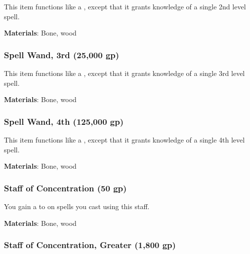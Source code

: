 This item functions like a , except that it grants knowledge of a single 2nd level spell.



\vspace{0.25em}
\textbf{Materials}: Bone, wood


\lowercase{\hypertarget{item:Spell Wand, 3rd}{}}\label{item:Spell Wand, 3rd}
\hypertarget{item:Spell Wand, 3rd}{\subsubsection{Spell Wand, 3rd\hfill{} (25,000 gp)}}

This item functions like a , except that it grants knowledge of a single 3rd level spell.



\vspace{0.25em}
\textbf{Materials}: Bone, wood


\lowercase{\hypertarget{item:Spell Wand, 4th}{}}\label{item:Spell Wand, 4th}
\hypertarget{item:Spell Wand, 4th}{\subsubsection{Spell Wand, 4th\hfill{} (125,000 gp)}}

This item functions like a , except that it grants knowledge of a single 4th level spell.



\vspace{0.25em}
\textbf{Materials}: Bone, wood


\lowercase{\hypertarget{item:Staff of Concentration}{}}\label{item:Staff of Concentration}
\hypertarget{item:Staff of Concentration}{\subsubsection{Staff of Concentration\hfill{} (50 gp)}}

You gain a   to  on spells you cast using this staff.



\vspace{0.25em}
\textbf{Materials}: Bone, wood


\lowercase{\hypertarget{item:Staff of Concentration, Greater}{}}\label{item:Staff of Concentration, Greater}
\hypertarget{item:Staff of Concentration, Greater}{\subsubsection{Staff of Concentration, Greater\hfill{} (1,800 gp)}}

